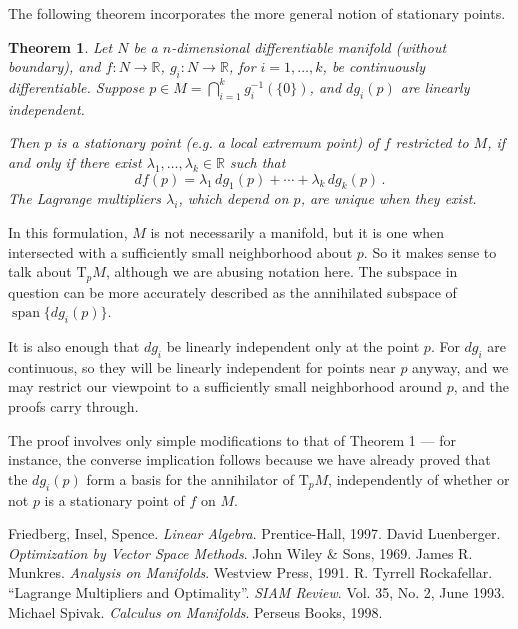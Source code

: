 \documentclass[12pt]{article}
\newcommand{\real}{\mathbb{R}}
\DeclareMathOperator{\linspan}{span}
\newcommand{\Tp}{\mathrm{T}_p}
\newtheorem{thm}{Theorem}
\begin{document}
The following theorem incorporates
the more general notion of stationary points.

\begin{thm}
Let $N$ be a $n$-dimensional differentiable manifold (without boundary), and $f \colon N \to \real$,
$g_i \colon N \to \real$, for $i = 1, \dotsc, k$,
be continuously differentiable. Suppose $p \in M = \bigcap_{i=1}^k g_i^{-1}( \{ 0 \})$, and
$dg_i(p)$ are linearly independent.

Then $p$ is a stationary point (e.g. a local extremum point) of $f$ restricted to $M$,
if and only if there exist $\lambda_1, \dotsc, \lambda_k \in \real$
such that
\[
d f(p) = \lambda_1 \, d g_1(p) + \dotsb + \lambda_k \, d g_k(p)\,.
\]
The Lagrange multipliers $\lambda_i$, which depend on $p$, are unique when they exist.
\end{thm}
In this formulation, $M$ is not necessarily a manifold,
but it is one when intersected with a sufficiently small neighborhood about $p$.
So it makes sense to talk about $\Tp M$, although we are abusing notation here.
The subspace in question can be more accurately described as the 
annihilated subspace of $\linspan \{ dg_i(p) \}$.

It is also enough that $dg_i$ be linearly independent 
only at the point $p$.
For $dg_i$ are continuous, so they will be 
linearly independent for points near 
$p$ anyway,
and we may restrict our viewpoint to a sufficiently small neighborhood
around $p$, and the proofs carry through.

The proof involves only simple modifications to
that of Theorem 1 --- for instance,
the converse implication follows
because we have already proved that the $d g_i(p)$ form a basis for the annihilator of $\Tp M$,
independently of whether or not $p$ is a stationary point of $f$ on $M$.


\begin{thebibliography}{3}
 Friedberg, Insel, Spence. {\it Linear Algebra}. Prentice-Hall, 1997.
 David Luenberger. {\it Optimization by Vector Space Methods}. 
John Wiley \& Sons, 1969.
 James R. Munkres. {\it Analysis on Manifolds}. Westview Press, 1991.
 R. Tyrrell Rockafellar. ``Lagrange Multipliers and Optimality''. {\it SIAM Review}. Vol. 35, No. 2, June 1993. 
 Michael Spivak. {\it Calculus on Manifolds}. Perseus Books, 1998.

\end{thebibliography}

\end{document}
